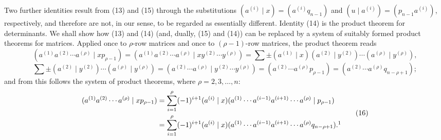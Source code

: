 \documentclass[10pt]{article}
\newcommand{\pair}[2]{(#1\mid #2)}
\begin{document}
Two further identities result from (13) and (15) through the substitutions $(a^{(i)}\mid x)=(a^{(i)}q_{n-1})$ and $(u\mid a^{(i)})=(p_{n-1}a^{(i)})$, respectively, and therefore are not, in our sense, to be regarded as essentially different. Identity (14) is the product theorem for determinants. We shall show how (13) and (14) (and, dually, (15) and (14)) can be replaced by a system of suitably formed product theorems for matrices. Applied once to $\rho$-row matrices and once to $(\rho-1)$-row matrices, the product theorem reads
\[
\pair{a^{(1)}a^{(2)}\cdots a^{(\rho)}}{xp_{\rho-1}}
=(a^{(1)}a^{(2)}\cdots a^{(\rho)}\mid xy^{(2)}\cdots y^{(\rho)})
=\sum\pm\pair{a^{(1)}}{x}\pair{a^{(2)}}{y^{(2)}}\cdots\pair{a^{(\rho)}}{y^{(\rho)}},
\]
\[
\sum\pm\pair{a^{(2)}}{y^{(2)}}\cdots\pair{a^{(\rho)}}{y^{(\rho)}}
=(a^{(2)}\cdots a^{(\rho)}\mid y^{(2)}\cdots y^{(\rho)})
=(a^{(2)}\cdots a^{(\rho)}p_{\rho-1})=(a^{(2)}\cdots a^{(\rho)}q_{n-\rho+1});
\]
and from this follows the system of product theorems, where $\rho=2,3,\ldots,n$:
\begin{equation}
\begin{aligned}
\pair{a^{(1)}a^{(2)}\cdots a^{(\rho)}}{xp_{\rho-1}}
 &=\sum_{i=1}^{\rho}(-1)^{i+1}\pair{a^{(i)}}{x}(a^{(1)}\cdots a^{(i-1)}a^{(i+1)}\cdots a^{(\rho)}\mid p_{\rho-1})\\
 &=\sum_{i=1}^{\rho}(-1)^{i+1}\pair{a^{(i)}}{x}(a^{(1)}\cdots a^{(i-1)}a^{(i+1)}\cdots a^{(\rho)}q_{n-\rho+1}).\footnotemark
\end{aligned}
\tag{16}
\end{equation}
\end{document}
